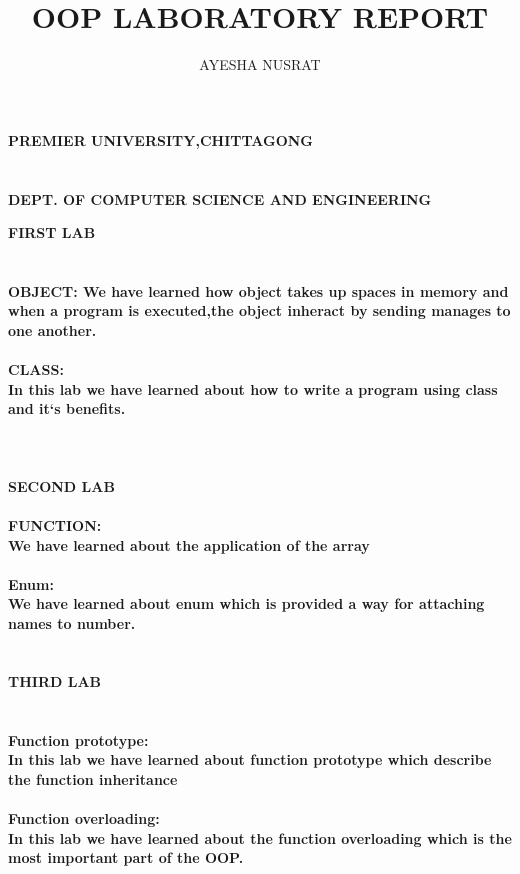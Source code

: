 \documentclass[12pt]{article}
\title{OOP LABORATORY REPORT}
\author{AYESHA NUSRAT}
\begin{document}
\textbf{\bigskip \bigskip \bigskip  \center PREMIER UNIVERSITY,CHITTAGONG \\}
 \textbf{\\ \\DEPT. OF COMPUTER SCIENCE AND ENGINEERING}
\maketitle
\newpage
\textbf{\center FIRST LAB \\}
\paragraph{\\OBJECT:
We have learned how object takes up spaces in memory and when a program is executed,the object inheract by sending manages to one another. \\}
\paragraph{CLASS: \\
In this lab we have learned about how to write a program using class and it`s benefits.\\ \\}
\textbf{\\ \center SECOND LAB \\}
\paragraph{FUNCTION: \\
We have learned about the application of the array}
\paragraph{Enum: \\
We have learned about enum which is provided a way for attaching names to number.\\ \\}
\textbf{\center THIRD LAB \\}
\paragraph{\\ Function prototype:\\ 
In this lab we have learned about function prototype which describe the function inheritance \\}
\paragraph{Function overloading:\\
In this lab we have learned about the function overloading which is the most important part of the OOP.\\}
\end{document}
